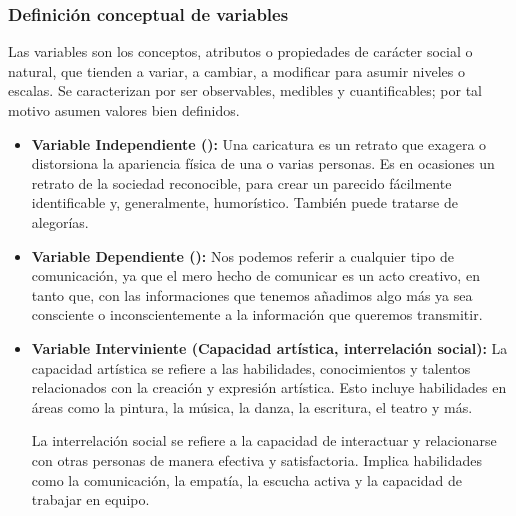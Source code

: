 \documentclass[12pt,a4paper]{article}
\begin{document}
\subsubsection{Definición conceptual de variables}

Las variables son los conceptos, atributos o propiedades de carácter social o natural, que tienden a variar, a cambiar, a modificar para asumir niveles o escalas. Se caracterizan por ser observables, medibles y cuantificables; por tal motivo asumen valores bien definidos.

\begin{itemize}
	\item \textbf{Variable Independiente (\variablei):} Una caricatura es un retrato que exagera o distorsiona la apariencia física de una o varias personas. Es en ocasiones un retrato de la sociedad reconocible, para crear un parecido fácilmente identificable y, generalmente, humorístico. También puede tratarse de alegorías.%

	\item \textbf{Variable Dependiente (\variabled):} Nos podemos referir a cualquier tipo de comunicación, ya que el mero hecho de comunicar es un acto creativo, en tanto que, con las informaciones que tenemos añadimos algo más ya sea consciente o inconscientemente a la información que queremos transmitir.%

	\item  \textbf{Variable Interviniente (Capacidad artística, interrelación social):} La capacidad artística se refiere a las habilidades, conocimientos y talentos relacionados con la creación y expresión artística. Esto incluye habilidades en áreas como la pintura, la música, la danza, la escritura, el teatro y más.

	      La interrelación social se refiere a la capacidad de interactuar y relacionarse con otras personas de manera efectiva y satisfactoria. Implica habilidades como la comunicación, la empatía, la escucha activa y la capacidad de trabajar en equipo.


\end{itemize}
\end{document}

